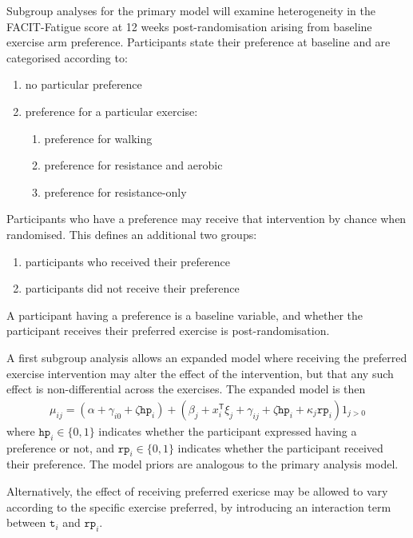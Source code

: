 \documentclass[
]{article}
\providecommand{\tightlist}{%
  \setlength{\itemsep}{0pt}\setlength{\parskip}{0pt}}
\begin{document}
Subgroup analyses for the primary model will examine heterogeneity in the FACIT-Fatigue score at 12 weeks post-randomisation arising from baseline exercise arm preference.
Participants state their preference at baseline and are categorised according to:

\begin{enumerate}\tightlist
  \item no particular preference
  \item preference for a particular exercise:
        \begin{enumerate}\tightlist
          \item preference for walking
          \item preference for resistance and aerobic
          \item preference for resistance-only
        \end{enumerate}
\end{enumerate}

Participants who have a preference may receive that intervention by chance when randomised.
This defines an additional two groups:
\begin{enumerate}\tightlist
  \item participants who received their preference
  \item participants did not receive their preference
\end{enumerate}

A participant having a preference is a baseline variable, and whether the participant receives their preferred exercise is post-randomisation.

A first subgroup analysis allows an expanded model where receiving the preferred exercise intervention may alter the effect of the intervention, but that any such effect is non-differential across the exercises.
The expanded model is then
$$
\begin{aligned}
\mu_{ij} = (\alpha + \gamma_{i0} + \zeta\texttt{hp}_i) + (\beta_j + x_i^{\mathsf{T}}\xi_{j} + \gamma_{ij} + \zeta\texttt{hp}_i + \kappa_j\texttt{rp}_i)1_{j>0}
\end{aligned}
$$
where $\texttt{hp}_i\in\{0,1\}$ indicates whether the participant expressed having a preference or not, and $\texttt{rp}_i\in\{0,1\}$ indicates whether the participant received their preference.
The model priors are analogous to the primary analysis model.

Alternatively, the effect of receiving preferred exericse may be allowed to vary according to the specific exercise preferred, by introducing an interaction term between $\texttt{t}_i$ and $\texttt{rp}_i$.
\end{document}

